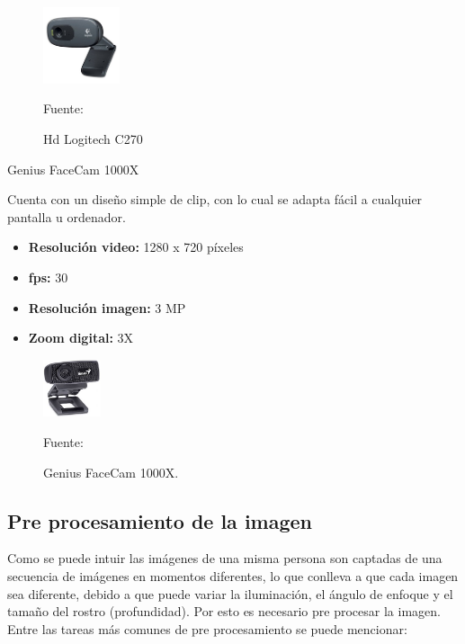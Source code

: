 \begin{enumerate}
\begin{figure}[ht]
\begin{center}
\includegraphics[width=0.2\textwidth]{Imagen10}
\end{center}
\begin{center}
\vskip -0.5cm
\caption{\small{Hd Logitech C270}}
{\small{Fuente: \cite{Amazon}}}
\end{center}
\end{figure}

{\bf\item[3. ] Genius FaceCam 1000X} \vskip 0.1cm
Cuenta con un diseño simple de clip, con lo cual se adapta fácil a cualquier pantalla u ordenador.
\begin{itemize}
\item[•] {\bf Resolución video:}
1280 x 720 píxeles
\item[•] {\bf fps:}
30
\item[•] {\bf Resolución imagen:}
3 MP
\item[•] {\bf Zoom digital:}
3X
\end{itemize}

\begin{figure}[ht]
\begin{center}
\includegraphics[width=0.15\textwidth]{Imagen11}
\end{center}
\begin{center}
\vskip -0.5cm
\caption{\small{Genius FaceCam 1000X.}}
{\small{Fuente: \cite{Amazon}}}
\end{center}
\end{figure}

\end{enumerate}
\vskip 1cm

\subsection{Pre procesamiento de la imagen}
Como se puede intuir las imágenes de una misma persona son captadas de una secuencia de imágenes en momentos diferentes, lo que conlleva a que cada imagen sea diferente, debido a que puede variar la iluminación, el ángulo de enfoque y el tamaño del rostro (profundidad). Por esto es necesario pre procesar la imagen. Entre las tareas más comunes de pre procesamiento se puede mencionar:

